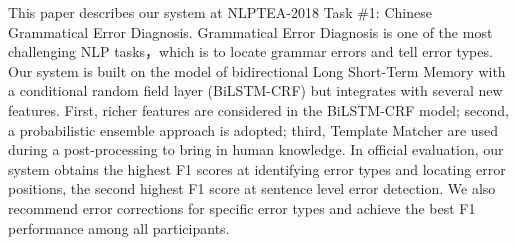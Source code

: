 This paper describes our system at NLPTEA-2018 Task \#1: Chinese Grammatical Error Diagnosis. Grammatical Error Diagnosis is one of the most challenging NLP tasks，which is to locate grammar errors and tell error types. Our system is built on the model of bidirectional Long Short-Term Memory with a conditional random field layer (BiLSTM-CRF) but integrates with several new features. First, richer features are considered in the BiLSTM-CRF model; second, a probabilistic ensemble approach is adopted; third, Template Matcher are used during a post-processing to bring in human knowledge. In official evaluation, our system obtains the highest F1 scores at identifying error types and locating error positions, the second highest F1 score at sentence level error detection. We also recommend error corrections for specific error types and achieve the best F1 performance among all participants.
